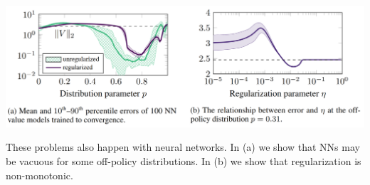 \begin{center}
    \includegraphics[scale=0.4]{parts/nn/nn2.png}
\end{center}
\vspace{-.11in}
These problems also happen with neural networks.
In (a) we show that NNs may be vacuous for some off-policy distributions. In (b) we show that regularization is non-monotonic.
\vspace{-.7in}
